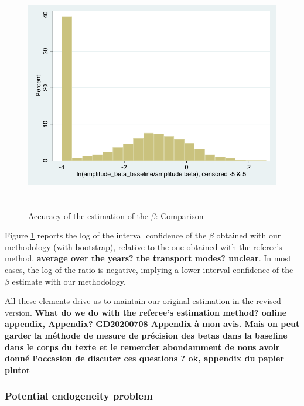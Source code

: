 \documentclass[a4paper,12pt]{article}
\begin{document}
\begin{itemize}
\begin{itemize}
\begin{figure}[htbp]
\caption{Accuracy of the estimation of the $\beta$: Comparison}
\label{fig:accuracy_beta}
\begin{center}
\includegraphics[height=4in]{accuracy_beta.pdf}
\end{center}
\end{figure}

Figure \ref{fig:accuracy_beta} reports the log of the interval confidence of the $\beta$ obtained with our methodology (with bootstrap), relative to the one obtained with the referee's method. \textbf{average over the years? the transport modes? unclear}. In most cases, the log of the ratio is negative, implying a lower interval confidence of the $\beta$ estimate with our methodology.

\end{itemize}
\end{itemize}

All these elements drive us to maintain our original estimation in the revised version. \textbf{What do we do with the referee's estimation method? online appendix, Appendix?}
\textbf{GD20200708 Appendix à mon avis. Mais on peut garder la méthode de mesure de précision des betas dans la baseline dans le corps du texte et le remercier abondamment de nous avoir donné l’occasion de discuter ces questions ? ok, appendix du papier plutot}




\subsubsection{Potential endogeneity problem}
\end{document}

